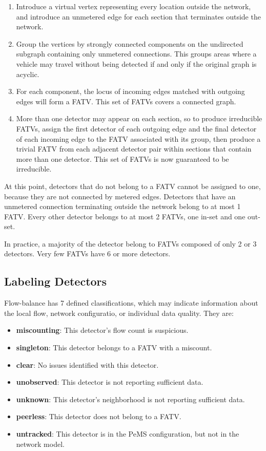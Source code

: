 \documentclass[titlepage]{article}
\begin{document}
\begin{enumerate}
	\item Introduce a virtual vertex representing every location outside the network, and introduce an unmetered edge for each section that terminates outside the network.
	\item Group the vertices by strongly connected components on the undirected subgraph containing only unmetered connections. This groups areas where a vehicle may travel without being detected if and only if the original graph is acyclic.
	\item For each component, the locus of incoming edges matched with outgoing edges will form a FATV. This set of FATVs covers a connected graph.
	\item More than one detector may appear on each section, so to produce irreducible FATVs, assign the first detector of each outgoing edge and the final detector of each incoming edge to the FATV associated with its group, then produce a trivial FATV from each adjacent detector pair within sections that contain more than one detector. This set of FATVs is now guaranteed to be irreducible.
\end{enumerate}

At this point, detectors that do not belong to a FATV cannot be assigned to one, because they are not connected by metered edges. Detectors that have an unmetered connection terminating outside the network belong to at most 1 FATV. Every other detector belongs to at most 2 FATVs, one in-set and one out-set.

In practice, a majority of the detector belong to FATVs composed of only 2 or 3 detectors. Very few FATVs have 6 or more detectors.

\subsection{Labeling Detectors}\label{labels}
Flow-balance has 7 defined classifications, which may indicate information about the local flow, network configuratio, or individual data quality. They are:

\begin{itemize}
	\item \textbf{miscounting}: This detector's flow count is suspicious.
	\item \textbf{singleton}: This detector belongs to a FATV with a miscount.
	\item \textbf{clear}: No issues identified with this detector.

	\item \textbf{unobserved}: This detector is not reporting sufficient data.
	\item \textbf{unknown}: This detector's neighborhood is not reporting sufficient data.

	\item \textbf{peerless}: This detector does not belong to a FATV.
	\item \textbf{untracked}: This detector is in the PeMS configuration, but not in the network model.
\end{itemize}
\end{document}
